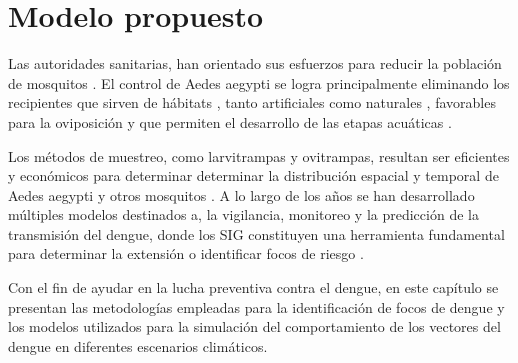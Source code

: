 \chapter{Modelo propuesto}

Las autoridades sanitarias, han orientado sus esfuerzos para reducir la población de mosquitos
\cite{planControlMspbs2014}. El control de Aedes aegypti se logra principalmente eliminando los
recipientes que sirven de hábitats \cite{world2009dengue}, tanto artificiales como naturales
\cite{world2009dengue, directricesDetvArg}, favorables para la oviposición y que permiten el
desarrollo de las etapas acuáticas \cite{world2009dengue}.

Los métodos de muestreo, como larvitrampas y ovitrampas, resultan ser eficientes
y económicos para determinar determinar la distribución espacial y temporal de Aedes aegypti y
otros mosquitos \cite{dengueUruguayCap1, cenaprece2013}. A lo largo de los años se han
desarrollado múltiples modelos destinados a, la vigilancia, monitoreo y la predicción de la
transmisión del dengue, donde los SIG constituyen una herramienta fundamental para determinar la
extensión o identificar focos de riesgo \citep{vgomesAegis2001,NINO2011}.

Con el fin de ayudar en la lucha preventiva contra el dengue, en este capítulo se presentan las
metodologías empleadas para la identificación de focos de dengue y los modelos utilizados para la
simulación del comportamiento de los vectores del dengue en diferentes escenarios climáticos.




%
%
%
